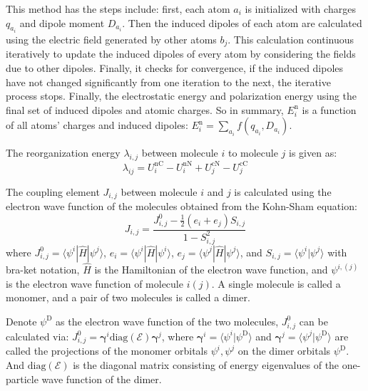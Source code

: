 \documentclass[letterpaper,12pt]{article}
\begin{document}
This method has the steps include: first, each atom $a_i$ is initialized with charges $q_{a_i}$ and dipole moment $D_{a_i}$. 
Then the induced dipoles of each atom are calculated using the electric field generated by other atoms $b_j$.
This calculation continuous iteratively to update the induced dipoles of every atom by considering the fields due to other dipoles.
Finally, it checks for convergence, if the induced dipoles have not changed significantly from one iteration to the next, the iterative process stops.
Finally, the electrostatic energy and polarization energy using the final set of induced dipoles and atomic charges. So in summary, $E^\text{n}_i$ is a function of all atoms' charges and induced dipoles: $E^\text{n}_i = \sum\limits_{a_i} f(q_{a_i}, D_{a_i})$. 

The reorganization energy $\lambda_{i,j}$ between molecule $i$ to molecule $j$ is given as:
\begin{equation}
    \lambda_{ij} = U_i^\text{nC} - U_i^\text{nN} + U_j^\text{cN} - U_j^\text{cC}
\end{equation}

The coupling element $J_{i,j}$ between molecule $i$ and $j$ is calculated \cite{baumeier_density_2010} using the electron wave function of the molecules obtained from the Kohn-Sham equation: 
\begin{equation}
    J_{i,j} = \frac{ J^0_{i,j}- \frac{1}{2}(e_i+e_j)S_{i,j} }{ 1- S_{i,j}^2 }
    \label{equ:JAB}
\end{equation}
where $J^0_{i,j} = \langle \psi^i | \hat{H} | \psi^j \rangle $, $e_i = \langle \psi^i | \hat{H} | \psi^i \rangle $, $e_j = \langle \psi^j | \hat{H} | \psi^j \rangle $, and $S_{i,j}=\langle \psi^i | \psi^j \rangle $ with bra-ket notation, $\hat{H}$ is the Hamiltonian of the electron wave function, and $\psi^{i,(j)}$ is the electron wave function of molecule $i(j)$. A single molecule is called a monomer, and a pair of two molecules is called a dimer.

Denote $\psi^\text{D}$ as the electron wave function of the two molecules,  $J^0_{i,j}$ can be calculated via:
$
    J^0_{i,j} = \mathbf{\gamma}^i \text{diag}(\mathcal{E}) \mathbf{\gamma}^j
$, 
where $\mathbf{\gamma}^i = \langle \psi^i | \psi^\text{D} \rangle$ and $\mathbf{\gamma}^j = \langle \psi^j | \psi^\text{D} \rangle$ are called the projections of the monomer orbitals $\psi^i, \psi^j$ on the dimer orbitals $\psi^\text{D}$. And $\text{diag}(\mathcal{E})$ is the diagonal matrix consisting of energy eigenvalues of the one-particle wave function of the dimer.
\end{document}
